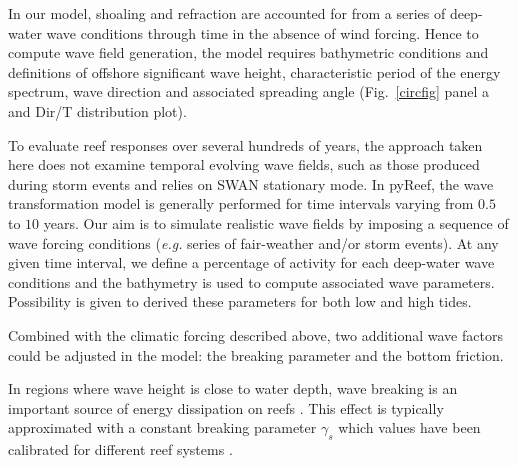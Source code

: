 \documentclass[default,jgrga]{agutex2015}
\begin{document}
\begin{article}
\noindent In our model, shoaling and refraction are accounted for from a series of deep-water wave conditions through time in the absence of wind forcing. Hence to compute wave field generation, the model requires bathymetric conditions and definitions of offshore significant wave height, characteristic period of the energy spectrum, wave direction and associated spreading angle (Fig.~\ref{circfig} panel a and Dir/T distribution plot).

\noindent To evaluate reef responses over several hundreds of years, the approach taken here does not examine temporal evolving wave fields, such as those produced during storm events and relies on SWAN stationary mode. In pyReef, the wave transformation model is generally performed for time intervals varying from $0.5$ to $10$ years. Our aim is to simulate realistic wave fields by imposing a sequence of wave forcing conditions (\textit{e.g.} series of fair-weather and/or storm events). At any given time interval, we define a percentage of activity for each deep-water wave conditions and the bathymetry is used to compute associated wave parameters. Possibility is given to derived these parameters for both low and high tides.

Combined with the climatic forcing described above, two additional wave factors could be adjusted in the model: the breaking parameter and the bottom friction.

\noindent In regions where wave height is close to water depth, wave breaking is an important source of energy dissipation on reefs \citep{Symonds95, Becker14}. This effect is typically approximated with a constant breaking parameter $\gamma_s$ \citep{Symonds95, Vetter10} which values have been calibrated for different reef systems \citep{Apotsos07, Vetter10, Monismith13, Franklin13, Rogers15}.


\end{article}
\end{document}
